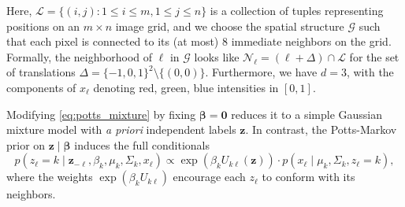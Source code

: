 \documentclass[12pt]{article}
\newcommand{\GG}{\mathcal{G}}
\newcommand{\LL}{\mathcal{L}}
\newcommand{\NN}{\mathcal{N}}
\begin{document}
Here, $\LL = \{(i, j): 1 \leq i \leq m, 1 \leq j \leq n\}$ is a
collection of tuples representing positions on an $m\times n$ image grid, and
we choose the spatial structure $\GG$ such that each pixel is connected to its
(at most) 8 immediate neighbors on the grid.
Formally, the neighborhood of $\ell$ in $\GG$ looks like $\NN_{\ell} = (\ell +
\Delta) \cap \LL$ for the set of translations $\Delta = \{-1, 0,
1\}^2\setminus\{(0, 0)\}$.
Furthermore, we have $d = 3$, with the components of $x_\ell$ denoting red,
green, blue intensities in $[0, 1]$.

Modifying \eqref{eq:potts_mixture} by fixing $\bm\beta = \bm0$ reduces it to a
simple Gaussian mixture model with \emph{a priori} independent labels $\bm{z}$.
In contrast, the Potts-Markov prior on $\bm{z} \mid \bm{\beta}$ induces the
full conditionals
\begin{equation}
    p(z_\ell = k \mid \bm{z}_{-\ell}, \beta_k, \mu_k, \Sigma_k, x_\ell)
        \propto \exp\left(\beta_k U_{k\ell}(\bm{z})\right) \cdot p(x_\ell \mid \mu_k, \Sigma_k, z_\ell = k),
\end{equation}
where the weights $\exp(\beta_k U_{k\ell})$ encourage each $z_\ell$ to conform
with its neighbors.


\end{document}
